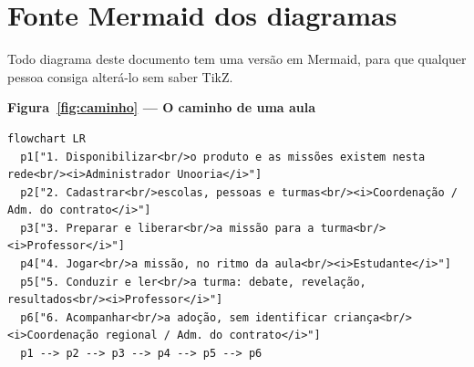 \chapter{Fonte Mermaid dos diagramas}
\label{ap:mermaid}

Todo diagrama deste documento tem uma versão em Mermaid, para que qualquer
pessoa consiga alterá-lo sem saber TikZ.

\textbf{Figura~\ref{fig:caminho} --- O caminho de uma aula}

\begin{lstlisting}[language=mermaid]
flowchart LR
  p1["1. Disponibilizar<br/>o produto e as missões existem nesta rede<br/><i>Administrador Unooria</i>"]
  p2["2. Cadastrar<br/>escolas, pessoas e turmas<br/><i>Coordenação / Adm. do contrato</i>"]
  p3["3. Preparar e liberar<br/>a missão para a turma<br/><i>Professor</i>"]
  p4["4. Jogar<br/>a missão, no ritmo da aula<br/><i>Estudante</i>"]
  p5["5. Conduzir e ler<br/>a turma: debate, revelação, resultados<br/><i>Professor</i>"]
  p6["6. Acompanhar<br/>a adoção, sem identificar criança<br/><i>Coordenação regional / Adm. do contrato</i>"]
  p1 --> p2 --> p3 --> p4 --> p5 --> p6
\end{lstlisting}
